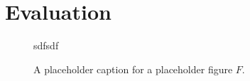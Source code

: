 \section{Evaluation}
\label{sec:eval}

\begin{figure}
  \centerline{}

\caption{A placeholder caption for a placeholder figure \boldmath$F$.}
sdfsdf
\label{fig:placeholder}
\end{figure}
